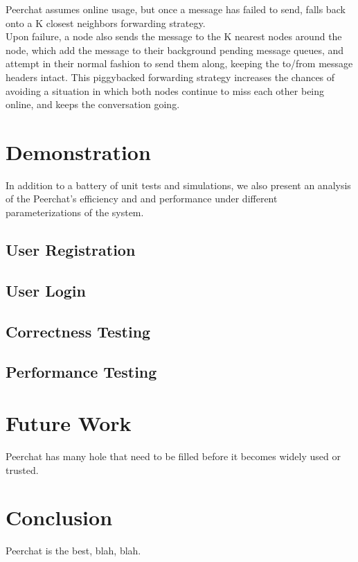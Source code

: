 \documentclass{article}
\begin{document}
Peerchat assumes online usage, but once a message has failed to send, falls back onto a K closest neighbors forwarding strategy. \\

Upon failure, a node also sends the message to the K nearest nodes around the node, which add the message to their background pending message queues, and attempt in their normal fashion to send them along, keeping the to/from message headers intact. This piggybacked forwarding strategy increases the chances of avoiding a situation in which both nodes continue to miss each other being online, and keeps the conversation going. 

\section{Demonstration}

In addition to a battery of unit tests and simulations, we also present an analysis of the Peerchat's efficiency and and performance under different parameterizations of the system. 

\subsection{User Registration}
\subsection{User Login}
\subsection{Correctness Testing}
\subsection{Performance Testing}

\section{Future Work}

Peerchat has many hole that need to be filled before it becomes widely used or trusted. 



\section{Conclusion}

Peerchat is the best, blah, blah.
\end{document}
